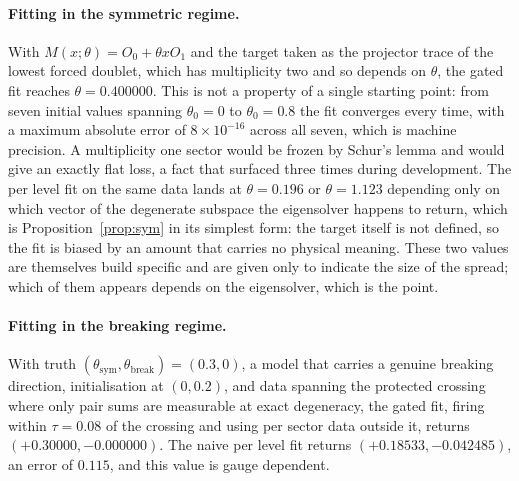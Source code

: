 \documentclass[10pt,a4paper]{amsart}
\begin{document}
\paragraph{Fitting in the symmetric regime.}
With $M(x;\theta)=O_0+\theta xO_1$ and the target taken as the projector trace of
the lowest forced doublet, which has multiplicity two and so depends on $\theta$,
the gated fit reaches $\theta=0.400000$. This is not a property of a single
starting point: from seven initial values spanning $\theta_0=0$ to $\theta_0=0.8$
the fit converges every time, with a maximum absolute error of $8\times10^{-16}$
across all seven, which is machine precision. A multiplicity one sector would be
frozen by Schur's lemma and would give an exactly flat loss, a fact that surfaced
three times during development. The per level fit on the same data lands at
$\theta=0.196$ or $\theta=1.123$ depending only on which vector of the degenerate
subspace the eigensolver happens to return, which is Proposition~\ref{prop:sym}
in its simplest form: the target itself is not defined, so the fit is biased by
an amount that carries no physical meaning. These two values are themselves build specific and are given only to indicate
the size of the spread; which of them appears depends on the eigensolver, which
is the point.

\paragraph{Fitting in the breaking regime.}
With truth
$(\theta_{\mathrm{sym}},\theta_{\mathrm{break}})=(0.3,0)$, a model that carries a
genuine breaking direction, initialisation at $(0,0.2)$, and data spanning the
protected crossing where only pair sums are measurable at exact degeneracy, the
gated fit, firing within $\tau=0.08$ of the crossing and using per sector data
outside it, returns $(+0.30000,-0.000000)$. The naive per level fit returns
$(+0.18533,-0.042485)$, an error of $0.115$, and this value is gauge dependent.
\end{document}
